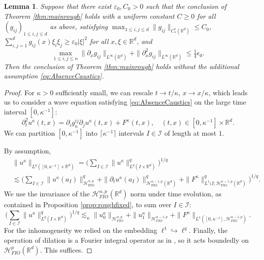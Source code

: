 \documentclass{amsart}
\numberwithin{equation}{section}
\newtheorem{lemma}[theorem]{Lemma}
\theoremstyle{definition}
\newcommand{\R}{\mathbb{R}}
\newcommand{\Rd}{\mathbb{R}^{d}}
\newcommand {\veps}{\varepsilon}
\newcommand {\ka}{\kappa}
\begin{document}
\begin{lemma}\label{lem:absencecaustics}
Suppose that there exist $\veps_{0},C_{0}>0$ such that the conclusion of Theorem \ref{thm:mainrough} holds with a uniform constant $C\geq0$ for all $(g_{ij})_{1\leq i,j\leq d}$ as above, satisfying $\max_{1\leq i,j\leq d}\|g_{ij}\|_{C^{r}_{*}(\Rd)}\leq C_{0}$, $\sum_{i,j=1}^{d}g_{ij}(x)\xi_{i}\xi_{j}\geq \veps_{0}|\xi|^{2}$ for all $x,\xi\in\Rd$, and
\begin{equation}
\label{eq:AbsenceCaustics}
\max_{1\leq i,j\leq n}\| \partial_x g_{ij} \|_{L^{\infty}(\Rd)} + \| \partial^2_{x} g_{ij} \|_{L^{\infty}(\Rd)} \leq \tfrac{1}{4}\epsilon_0.
\end{equation}
Then the conclusion of Theorem \ref{thm:mainrough} holds without the additional assumption \eqref{eq:AbsenceCaustics}.
\end{lemma}
\begin{proof}
For $\ka>0$ sufficiently small, we can rescale $t \to t/\kappa$, $x \to x/\kappa$, which leads us to consider a wave equation satisfying \eqref{eq:AbsenceCaustics} on the large time interval $[0,\kappa^{-1}]$:
\begin{equation*}
    \partial_t^2 u^{\kappa}(t,x)= \partial_i g^{ij}_{\kappa} \partial_j u^{\kappa}(t,x) + F^{\kappa}(t,x), \quad (t,x) \in [0,\kappa^{-1}] \times \R^d.
\end{equation*}
We can partition $[0,\kappa^{-1}]$ into $\lceil \kappa^{-1} \rceil$ intervals $I \in \mathcal{I}$ %
of length at most $1$. %

By assumption,
\[
\begin{split}
    &\| u^{\kappa} \|_{L^q([0,\kappa^{-1}] \times \R^d)}=\Big( \sum_{I \in \mathcal{I}} \| u^{\kappa} \|^q_{L^q(I \times \R^d)} \Big)^{1/q} \\
    &\lesssim\Big(\sum_{I \in \mathcal{I}} \| u^{\kappa}(a_I) \|^q_{\mathcal{H}^{\alpha,p}_{\text{FIO}}} + \| \partial_t u^{\kappa}(a_I) \|^q_{\mathcal{H}^{\alpha-1,p}_{\text{FIO}}(\R^d)} + \| F^{\kappa} \|^q_{L^1(I;\mathcal{H}^{\alpha-1,p}_{\text{FIO}}(\R^d)} \big)^{1/q}.
\end{split}
\]
We use the invariance of the $\mathcal{H}^{\alpha,p}_{FIO}(\Rd)$ norm under time evolution, as contained in Proposition \ref{prop:roughfixed}, to sum over $I \in \mathcal{I}$:
\begin{equation*}
\Big( \sum_{I \in \mathcal{I}} \| u^{\kappa} \|^q_{L^q(I \times \R^d)} \Big)^{1/q}\lesssim_{\ka} %
\| u^{\kappa}_0 \|_{\mathcal{H}^{\alpha,p}_{FIO}} + \| u_1^{\kappa} \|_{\mathcal{H}^{\alpha-1,p}_{FIO}} + \| F^{\kappa} \|_{L^1([0,\kappa^{-1}],\mathcal{H}^{\alpha-1,p}_{FIO})}.
\end{equation*}
For the inhomogeneity we relied on the embedding $\ell^1 \hookrightarrow \ell^q$. %
Finally, the operation of dilation is a Fourier integral operator as in \cite[Proposition 3.3]{Rozendaal22b}, so it acts boundedly on $\mathcal{H}^p_{FIO}(\Rd)$. This suffices.
\end{proof}
\end{document}
